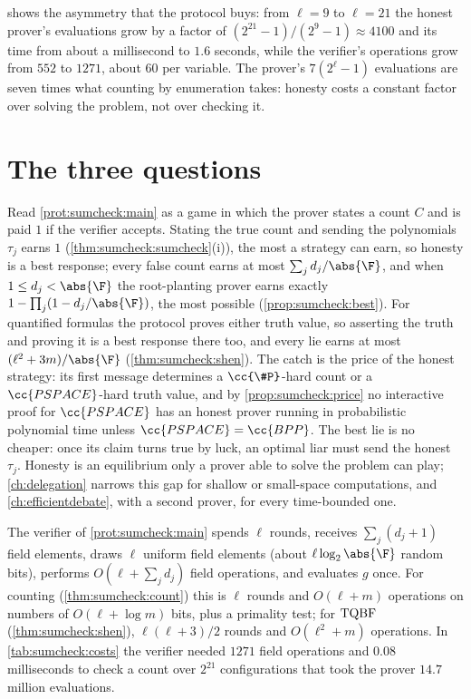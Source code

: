 \begin{refsection}
 shows the asymmetry that the protocol buys: from $\ell=9$ to $\ell=21$ the honest prover's evaluations grow by a factor of $(2^{21}-1)/(2^9-1)\approx4100$ and its time from about a millisecond to $1.6$ seconds, while the verifier's operations grow from $552$ to $1271$, about $60$ per variable. The prover's $7(2^\ell-1)$ evaluations are seven times what counting by enumeration takes: honesty costs a constant factor over solving the problem, not over checking it.

\section{The three questions}\label{sec:sumcheck:questions}

\questionone Read \cref{prot:sumcheck:main} as a game in which the prover states a count $C$ and is paid $1$ if the verifier accepts. Stating the true count and sending the polynomials $\tau_j$ earns $1$ (\cref{thm:sumcheck:sumcheck}(i)), the most a strategy can earn, so honesty is a best response; every false count earns at most $\sum_jd_j/\abs{\F}$, and when $1\le d_j<\abs{\F}$ the root-planting prover earns exactly $1-\prod_j(1-d_j/\abs{\F})$, the most possible (\cref{prop:sumcheck:best}). For quantified formulas the protocol proves either truth value, so asserting the truth and proving it is a best response there too, and every lie earns at most $(\ell^2+3m)/\abs{\F}$ (\cref{thm:sumcheck:shen}). The catch is the price of the honest strategy: its first message determines a $\cc{\#P}$-hard count or a $\cc{PSPACE}$-hard truth value, and by \cref{prop:sumcheck:price} no interactive proof for $\cc{PSPACE}$ has an honest prover running in probabilistic polynomial time unless $\cc{PSPACE}=\cc{BPP}$. The best lie is no cheaper: once its claim turns true by luck, an optimal liar must send the honest $\tau_j$. Honesty is an equilibrium only a prover able to solve the problem can play; \cref{ch:delegation} narrows this gap for shallow or small-space computations, and \cref{ch:efficientdebate}, with a second prover, for every time-bounded one.

\questiontwo The verifier of \cref{prot:sumcheck:main} spends $\ell$ rounds, receives $\sum_j(d_j+1)$ field elements, draws $\ell$ uniform field elements (about $\ell\log_2\abs{\F}$ random bits), performs $O(\ell+\sum_jd_j)$ field operations, and evaluates $g$ once. For counting (\cref{thm:sumcheck:count}) this is $\ell$ rounds and $O(\ell+m)$ operations on numbers of $O(\ell+\log m)$ bits, plus a primality test; for $\mathrm{TQBF}$ (\cref{thm:sumcheck:shen}), $\ell(\ell+3)/2$ rounds and $O(\ell^2+m)$ operations. In \cref{tab:sumcheck:costs} the verifier needed $1271$ field operations and $0.08$ milliseconds to check a count over $2^{21}$ configurations that took the prover $14.7$ million evaluations.


\end{refsection}
